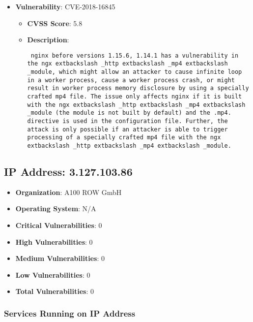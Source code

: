 \documentclass{article}
\begin{document}
\begin{itemize}
        \item \textbf{Vulnerability}: CVE-2018-16845
        \begin{itemize}
            \item \textbf{CVSS Score}:  5.8 
            \item \textbf{Description}: \parbox{\linewidth}{\texttt{ nginx before versions 1.15.6, 1.14.1 has a vulnerability in the ngx	extbackslash _http	extbackslash _mp4	extbackslash _module, which might allow an attacker to cause infinite loop in a worker process, cause a worker process crash, or might result in worker process memory disclosure by using a specially crafted mp4 file. The issue only affects nginx if it is built with the ngx	extbackslash _http	extbackslash _mp4	extbackslash _module (the module is not built by default) and the .mp4. directive is used in the configuration file. Further, the attack is only possible if an attacker is able to trigger processing of a specially crafted mp4 file with the ngx	extbackslash _http	extbackslash _mp4	extbackslash _module. }}
        \end{itemize}
    
\end{itemize}


\clearpage



\subsection*{IP Address: 3.127.103.86}

\begin{itemize}
    \item \textbf{Organization}: A100 ROW GmbH
    \item \textbf{Operating System}:  N/A 
    \item \textbf{Critical Vulnerabilities}: 0
    \item \textbf{High Vulnerabilities}: 0
    \item \textbf{Medium Vulnerabilities}: 0
    \item \textbf{Low Vulnerabilities}: 0
    \item \textbf{Total Vulnerabilities}: 0
\end{itemize}

\subsubsection*{Services Running on IP Address}
\end{document}
